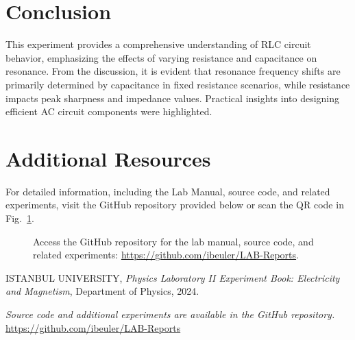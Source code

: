 \documentclass[journal]{IEEEtran}
\begin{document}
\section{Conclusion}
This experiment provides a comprehensive understanding of RLC circuit behavior, emphasizing the effects of varying resistance and capacitance on resonance. From the discussion, it is evident that resonance frequency shifts are primarily determined by capacitance in fixed resistance scenarios, while resistance impacts peak sharpness and impedance values. Practical insights into designing efficient AC circuit components were highlighted.

\section{Additional Resources}
For detailed information, including the Lab Manual, source code, and related experiments, visit the GitHub repository provided below or scan the QR code in Fig.~\ref{fig:qr_code}.

\begin{figure}[H]
    
    \centering
    \begin{minipage}{0.15\textwidth}
        \centering
    \end{minipage}%
    \begin{minipage}{0.2\textwidth}
        \raggedright
        \caption{Access the GitHub repository for the lab manual, source code, and related experiments: \href{https://github.com/ibeuler/LAB-Reports}{\url{https://github.com/ibeuler/LAB-Reports}}.}
        \label{fig:qr_code}
    \end{minipage}
\end{figure}

\begin{thebibliography}{9}
    ISTANBUL UNIVERSITY, \textit{Physics Laboratory II Experiment Book: Electricity and Magnetism}, Department of Physics, 2024.

    \textit{Source code and additional experiments are available in the GitHub repository.} \url{https://github.com/ibeuler/LAB-Reports}
\end{thebibliography}
\end{document}
